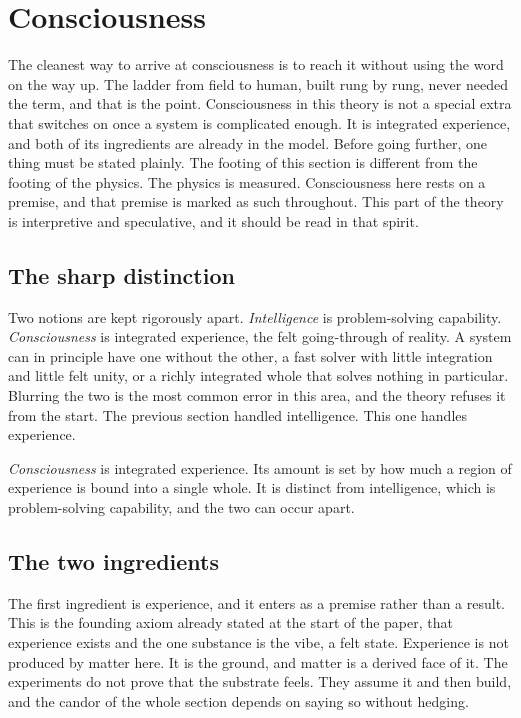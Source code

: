 \section{Consciousness}

The cleanest way to arrive at consciousness is to reach it without using the word on the way up. The ladder from
field to human, built rung by rung, never needed the term, and that is the point. Consciousness in this theory is
not a special extra that switches on once a system is complicated enough. It is integrated experience, and both of
its ingredients are already in the model. Before going further, one thing must be stated plainly. The footing of
this section is different from the footing of the physics. The physics is measured. Consciousness here rests on a
premise, and that premise is marked as such throughout. This part of the theory is interpretive and speculative,
and it should be read in that spirit.

\subsection{The sharp distinction}

Two notions are kept rigorously apart. \emph{Intelligence} is problem-solving capability. \emph{Consciousness} is
integrated experience, the felt going-through of reality. A system can in principle have one without the other, a
fast solver with little integration and little felt unity, or a richly integrated whole that solves nothing in
particular. Blurring the two is the most common error in this area, and the theory refuses it from the start. The
previous section handled intelligence. This one handles experience.

\begin{definition}[Consciousness]
\emph{Consciousness} is integrated experience. Its amount is set by how much a region of experience is bound into
a single whole. It is distinct from intelligence, which is problem-solving capability, and the two can occur
apart.
\end{definition}

\subsection{The two ingredients}

The first ingredient is experience, and it enters as a premise rather than a result. This is the founding axiom
already stated at the start of the paper, that experience exists and the one substance is the vibe, a felt state.
Experience is not produced by matter here. It is the ground, and matter is a derived face of it. The experiments
do not prove that the substrate feels. They assume it and then build, and the candor of the whole section depends
on saying so without hedging.

